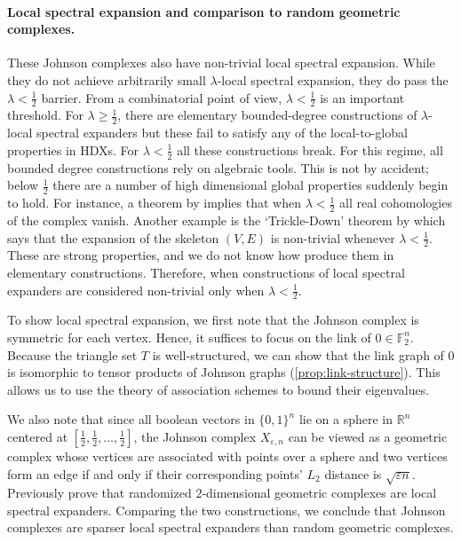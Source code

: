 \documentclass[10pt,a4paper]{article}
\newcommand{\prettyref}[1]{\cref{#1}}
\theoremstyle{definition}
\theoremstyle{remark}
\newcommand{\F}{\mathbb{F}}
\newcommand{\R}{\mathbb R}
\renewcommand{\geq}{\geqslant}
\numberwithin{equation}{section}
\let\origparagraph\paragraph
\renewcommand{\paragraph}[1]{\origparagraph{#1.}}
\let\pref=\prettyref
\begin{document}
\paragraph{Local spectral expansion and comparison to random geometric complexes}
These Johnson complexes also have non-trivial local spectral expansion. While they do not achieve arbitrarily small \(\lambda\)-local spectral expansion, they do pass the \(\lambda < \frac{1}{2}\) barrier. From a combinatorial point of view, \(\lambda < \frac{1}{2}\) is an important threshold. For \(\lambda \geq \frac{1}{2}\), there are elementary bounded-degree constructions of \(\lambda\)-local spectral expanders \cite{Conlon2019,ChapmanLP2020,ConlonTZ2020,LiuMY2020,Golowich2021} but these fail to satisfy any of the local-to-global properties in HDXs. For \(\lambda < \frac{1}{2}\) all these constructions break. For this regime, all bounded degree constructions rely on algebraic tools. This is not by accident; below \(\frac{1}{2}\) there are a number of high dimensional global properties suddenly begin to hold. For instance, a theorem by \cite{Garland1973} implies that when \(\lambda < \frac{1}{2}\) all real cohomologies of the complex vanish. Another example is the `Trickle-Down' theorem by \cite{oppenheim2018local} which says that the expansion of the skeleton \((V,E)\) is non-trivial whenever \(\lambda < \frac{1}{2}\). These are strong properties, and we do not know how produce them in elementary constructions. Therefore, when constructions of local spectral expanders are considered non-trivial only when \(\lambda < \frac{1}{2}\).

To show local spectral expansion, we first note that the Johnson complex is symmetric for each vertex. Hence, it suffices to focus on the link of $0 \in \F_2^n$. Because the triangle set $T$ is well-structured, we can show that the link graph of $0$ is isomorphic to tensor products of Johnson graphs (\pref{prop:link-structure}). This allows us to use the theory of association schemes to bound their eigenvalues. 

We also note that since all boolean vectors in $\{0,1\}^n$ lie on a sphere in $\R^n$ centered at $[\frac{1}{2},\frac{1}{2},\dots,\frac{1}{2}]$, the Johnson complex $X_{\varepsilon,n}$ can be viewed as a geometric complex whose vertices are associated with points over a sphere and two vertices form an edge if and only if their corresponding points' $L_2$ distance is $\sqrt{\varepsilon n}$. Previously \cite{LiuMSY2023} prove that randomized $2$-dimensional geometric complexes are local spectral expanders. Comparing the two constructions, we conclude that Johnson complexes are sparser local spectral expanders than random geometric complexes.
\end{document}

